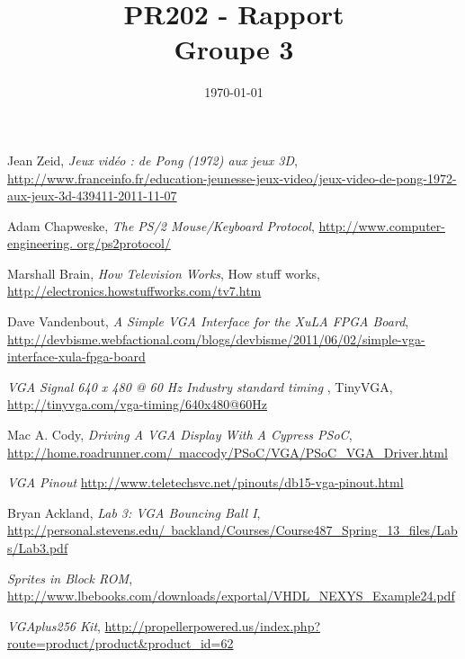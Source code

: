 \documentclass[a4paper, 11pt]{article}
\title{PR202 - Rapport \\
\normalsize{Groupe 3}}
\date{\today}
\begin{document}
\maketitle

\newpage
\tableofcontents

\newpage







\begin{thebibliography}{10}
 Jean Zeid, \emph{Jeux vidéo : de Pong (1972) aux jeux 3D}, \href{http://www.franceinfo.fr/education-jeunesse-jeux-video/jeux-video-de-pong-1972-aux-jeux-3d-439411-2011-11-07}{http://www.franceinfo.fr/education-jeunesse-jeux-video/jeux-video-de-pong-1972-aux-jeux-3d-439411-2011-11-07}

  Adam Chapweske, \emph{The PS/2 Mouse/Keyboard Protocol}, \href{http://www.computer-engineering.org/ps2protocol/}{http://www.computer-engineering. org/ps2protocol/}

 Marshall Brain, \emph{How Television Works}, How stuff works, \href{http://electronics.howstuffworks.com/tv7.htm}{http://electronics.howstuffworks.com/tv7.htm}

 Dave Vandenbout, \emph{A Simple VGA Interface for the XuLA FPGA Board}, \href{http://devbisme.webfactional.com/blogs/devbisme/2011/06/02/simple-vga-interface-xula-fpga-board}{http://devbisme.webfactional.com/blogs/devbisme/2011/06/02/simple-vga-interface-xula-fpga-board}

 \emph{VGA Signal 640 x 480 @ 60 Hz Industry standard timing} , TinyVGA, \href{http://tinyvga.com/vga-timing/640x480@60Hz}{http://tinyvga.com/vga-timing/640x480@60Hz}

 Mac A. Cody, \emph{Driving A VGA Display With A Cypress PSoC}, \href{http://home.roadrunner.com/~maccody/PSoC/VGA/PSoC\_VGA\_Driver.html}{http://home.roadrunner.com/~maccody/PSoC/VGA/PSoC\_VGA\_Driver.html}

 \emph{VGA Pinout} \href{http://www.teletechsvc.net/pinouts/db15-vga-pinout.html}{http://www.teletechsvc.net/pinouts/db15-vga-pinout.html}

 Bryan Ackland, \emph{Lab 3: VGA Bouncing Ball I}, \href{http://personal.stevens.edu/~backland/Courses/Course487\_Spring_13\_files/Labs/Lab3.pdf}{http://personal.stevens.edu/~backland/Courses/Course487\_Spring\_13\_files/Labs/Lab3.pdf}

 \emph{Sprites in Block ROM}, \href{http://www.lbebooks.com/downloads/exportal/VHDL\_NEXYS\_Example24.pdf}{http://www.lbebooks.com/downloads/exportal/VHDL\_NEXYS\_Example24.pdf}

 \emph{VGAplus256 Kit}, \href{http://propellerpowered.us/index.php?route=product/product\&product\_id=62}
{http://propellerpowered.us/index.php?route=product/product\&product\_id=62}

\end{thebibliography}
\end{document}

